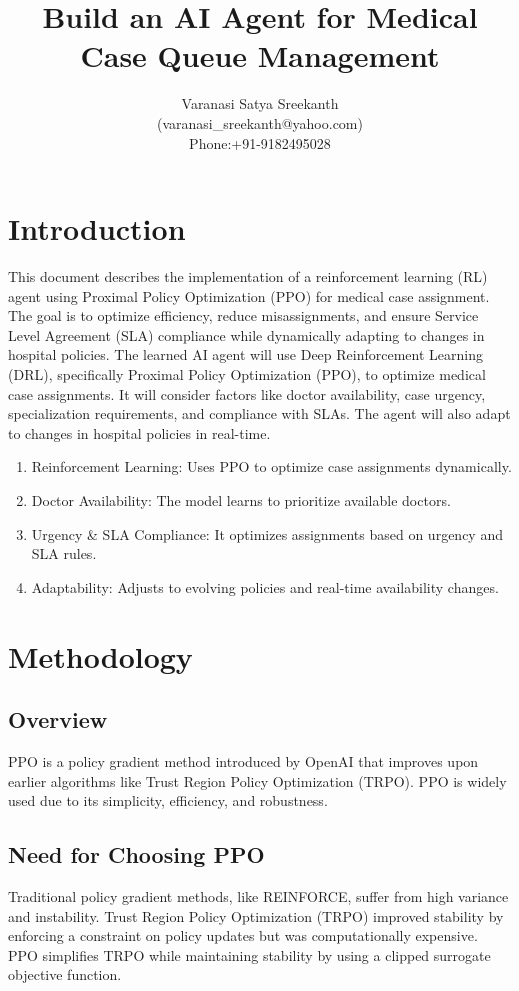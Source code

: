 \documentclass[11pt]{article}
\title{\textbf{Build an AI Agent for Medical Case Queue Management}}
\author{Varanasi Satya Sreekanth\\
	(varanasi\_sreekanth@yahoo.com)\\Phone:+91-9182495028}
\begin{document}
	\maketitle

\section{Introduction}	This document describes the implementation of a reinforcement learning (RL) agent using Proximal Policy Optimization (PPO) for medical case assignment. The goal is to optimize efficiency, reduce misassignments, and ensure Service Level Agreement (SLA) compliance while dynamically adapting to changes in hospital policies. The learned AI agent will use Deep Reinforcement Learning (DRL), specifically Proximal Policy Optimization (PPO), to optimize medical case assignments. It will consider factors like doctor availability, case urgency, specialization requirements, and compliance with SLAs. The agent will also adapt to changes in hospital policies in real-time. 
\begin{enumerate}
\item Reinforcement Learning: Uses PPO to optimize case assignments dynamically.
\item Doctor Availability: The model learns to prioritize available doctors.
\item Urgency & SLA Compliance: It optimizes assignments based on urgency and SLA rules.
\item Adaptability: Adjusts to evolving policies and real-time availability changes.
\end{enumerate}
\section{Methodology}

\subsection{Overview}
PPO is a policy gradient method introduced by OpenAI that improves upon earlier algorithms like Trust Region Policy Optimization (TRPO). PPO is widely used due to its simplicity, efficiency, and robustness.

\subsection{Need for Choosing PPO}
Traditional policy gradient methods, like REINFORCE, suffer from high variance and instability. Trust Region Policy Optimization (TRPO) improved stability by enforcing a constraint on policy updates but was computationally expensive. PPO simplifies TRPO while maintaining stability by using a clipped surrogate objective function.
\end{document}
